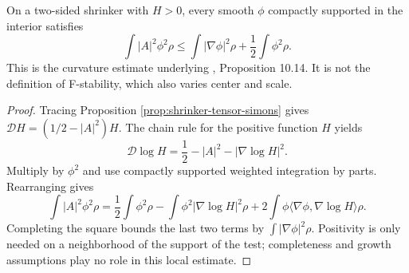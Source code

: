 \begin{proposition}\label{prop:meanconvex-shrinker-weighted-estimate}
On a two-sided shrinker with $H>0$, every smooth $\phi$ compactly supported in the interior satisfies
\[
 \int |A|^2\phi^2\rho\leq\int|\nabla\phi|^2\rho+\frac12\int\phi^2\rho.
\]
This is the curvature estimate underlying \cite{CM12}, Proposition 10.14. It is not the definition of F-stability, which also varies center and scale.
\end{proposition}
\begin{proof}
Tracing Proposition \ref{prop:shrinker-tensor-simons} gives $\mathcal D H=(1/2-|A|^2)H$. The chain rule for the positive function $H$ yields
\[
 \mathcal D\log H=\frac12-|A|^2-|\nabla\log H|^2.
\]
Multiply by $\phi^2$ and use compactly supported weighted integration by parts. Rearranging gives
\[
 \int |A|^2\phi^2\rho=\frac12\int\phi^2\rho
 -\int\phi^2|\nabla\log H|^2\rho
 +2\int\phi\langle\nabla\phi,\nabla\log H\rangle\rho.
\]
Completing the square bounds the last two terms by $\int|\nabla\phi|^2\rho$. Positivity is only needed on a neighborhood of the support of the test; completeness and growth assumptions play no role in this local estimate.
\end{proof}
